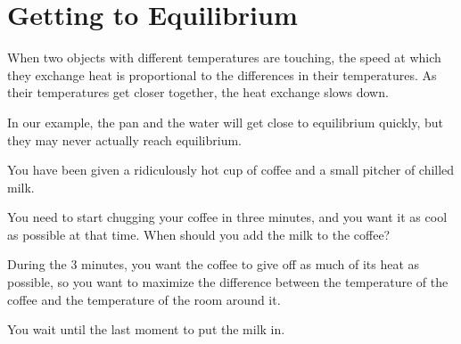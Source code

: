 \section{Getting to Equilibrium}

When two objects with different temperatures are touching, the speed
at which they exchange heat is proportional to the differences in
their temperatures. As their temperatures get closer together,
the heat exchange slows down.

In our example, the pan and the water will get close to equilibrium
quickly, but they may never actually reach equilibrium.


\begin{Exercise}[title={Cooling Your Coffee}, label=cool_coffee]

  You have been given a ridiculously hot cup of coffee and a small pitcher of chilled milk.

  You need to start chugging your coffee in three minutes, and you want it as cool as possible at that time. When should you add the milk to the coffee?

\end{Exercise}
\begin{Answer}[ref=cool_coffee]

  During the 3 minutes, you want the coffee to give off as much of its
  heat as possible, so you want to maximize the difference between the
  temperature of the coffee and the temperature of the room around
  it.

  You wait until the last moment to put the milk in.

\end{Answer}

